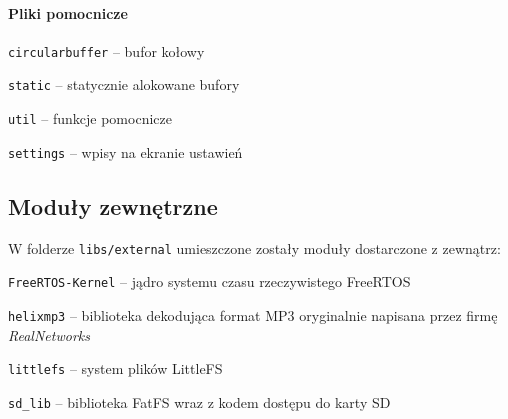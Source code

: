 \documentclass[12pt]{report}
\let\tempone\itemize
\let\temptwo\enditemize
\renewenvironment{itemize}{\tempone\setlength{\itemsep}{0cm}}{\temptwo}
\begin{document}
			\paragraph{Pliki pomocnicze}
				\begin{itemize}
					\item \lstinline|circularbuffer| -- bufor kołowy
					\item \lstinline|static| -- statycznie alokowane bufory
					\item \lstinline|util| -- funkcje pomocnicze
					\item \lstinline|settings| -- wpisy na ekranie ustawień
				\end{itemize}
	
		\subsection{Moduły zewnętrzne}
		W folderze \lstinline|libs/external| umieszczone zostały moduły dostarczone z zewnątrz:
		\begin{itemize}
			\item \lstinline|FreeRTOS-Kernel| -- jądro systemu czasu rzeczywistego FreeRTOS\textsuperscript{\cite{freertos_kernel}}
			\item \lstinline|helixmp3| -- biblioteka dekodująca format MP3\textsuperscript{\cite{helixmp3_repo}} oryginalnie napisana przez firmę \textit{RealNetworks}\textsuperscript{\cite{realnetworks}}
			\item \lstinline|littlefs| -- system plików LittleFS\textsuperscript{\cite{littlefs}}
			\item \lstinline|sd_lib| -- biblioteka FatFS\textsuperscript{\cite{fatfs}} wraz z kodem dostępu do karty SD\textsuperscript{\cite{sdfs}}
		\end{itemize}
\end{document}
